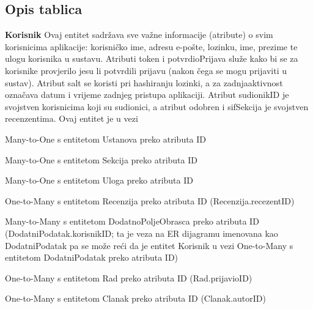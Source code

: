 			\subsection{Opis tablica}
			
				\textbf{Korisnik}
				\newline
				\indent Ovaj entitet sadržava sve važne informacije (atribute) o svim korisnicima aplikacije: korisničko ime, adresu e-pošte, lozinku, ime, prezime te ulogu korisnika u sustavu. Atributi token i potvrdioPrijava služe kako bi se za korisnike provjerilo jesu li potvrdili prijavu (nakon čega se mogu prijaviti u sustav). Atribut salt se koristi pri hashiranju lozinki, a za zadnjaaktivnost označava datum i vrijeme zadnjeg pristupa aplikaciji. Atribut sudionikID je svojstven korisnicima koji su sudionici, a atribut odobren i sifSekcija je svojstven recenzentima. Ovaj entitet je u vezi \begin{packed_item} 
					\item Many-to-One s entitetom Ustanova preko atributa ID
					\item Many-to-One s entitetom Sekcija preko atributa ID
					\item Many-to-One s entitetom Uloga preko atributa ID
					\item One-to-Many s entitetom Recenzija preko atributa ID (Recenzija.recezentID)
					\item Many-to-Many s entitetom DodatnoPoljeObrasca preko atributa ID (DodatniPodatak.korisnikID; ta je veza na ER dijagramu imenovana kao DodatniPodatak pa se može reći da je entitet Korisnik u vezi One-to-Many s entitetom DodatniPodatak preko atributa ID)
					\item One-to-Many s entitetom Rad preko atributa ID (Rad.prijavioID)
					
					\item One-to-Many s entitetom Clanak preko atributa ID (Clanak.autorID)
					
				\end{packed_item}
